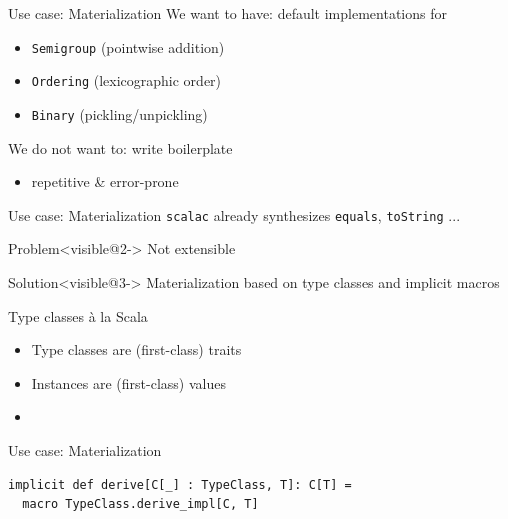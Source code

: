 \documentclass{beamer}
\begin{document}
\begin{frame}{Use case: Materialization}
  We want to have: default implementations for
  \begin{itemize}
    \item \texttt{Semigroup} (pointwise addition)
    \item \texttt{Ordering} (lexicographic order)
    \item \texttt{Binary} (pickling/unpickling)
  \end{itemize}

  \vspace{1em}
  We do not want to: write boilerplate
  \begin{itemize}
    \item repetitive \& error-prone
  \end{itemize}
\end{frame}

\begin{frame}{Use case: Materialization}
  \texttt{scalac} already synthesizes \texttt{equals}, \texttt{toString} ...

  \vspace{1em}
  \begin{alertblock}{Problem}<visible@2->
    Not extensible
  \end{alertblock}

  \vspace{1em}
  \begin{exampleblock}{Solution}<visible@3->
    Materialization based on type classes and implicit macros
  \end{exampleblock}
\end{frame}

\begin{frame}{Type classes \`a la Scala}
  \begin{itemize}
    \item Type classes are (first-class) traits
    \item Instances are (first-class) values
    \item<visible@2> \text{\color{blue}{Both can use arbitrary language features}}
  \end{itemize}
\end{frame}

\begin{frame}[fragile]{Use case: Materialization}
  \begin{verbatim}
implicit def derive[C[_] : TypeClass, T]: C[T] =
  macro TypeClass.derive_impl[C, T]
  \end{verbatim}
\end{frame}
\end{document}
